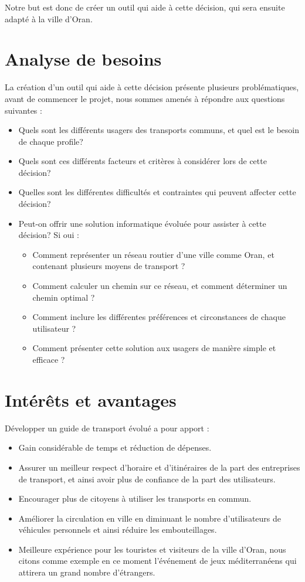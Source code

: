 Notre but est donc de créer un outil qui aide à cette décision, qui sera ensuite adapté à la ville d'Oran.

\section{Analyse de besoins}
La création d'un outil qui aide à cette décision présente plusieurs problématiques, avant de commencer le projet, nous sommes amenés à répondre aux questions suivantes :
\begin{itemize}
	\item Quels sont les différents usagers des transports communs, et quel est le besoin de chaque profile?
	\item Quels sont ces différents facteurs et critères à considérer lors de cette décision?
	\item Quelles sont les différentes difficultés et contraintes qui peuvent affecter cette décision?
	\item Peut-on offrir une solution informatique évoluée pour assister à cette décision? Si oui : 
	      \begin{itemize}
	      	\item Comment représenter un réseau routier d'une ville comme Oran, et contenant plusieurs moyens de transport ?
	      	\item Comment calculer un chemin sur ce réseau, et comment déterminer un chemin optimal ?
	      	\item Comment inclure les différentes préférences et circonstances de chaque utilisateur ?
	      	\item Comment présenter cette solution aux usagers de manière simple et efficace ?
	      \end{itemize}
\end{itemize}

\section{Intérêts et avantages}
Développer un guide de transport évolué a pour apport :
\begin{itemize}
	\item Gain considérable de temps et réduction de dépenses.
	\item Assurer un meilleur respect d'horaire et d'itinéraires de la part des entreprises de transport, et ainsi avoir plus de confiance de la part des utilisateurs.
	\item Encourager plus de citoyens à utiliser les transports en commun.
	\item Améliorer la circulation en ville en diminuant le nombre d'utilisateurs de véhicules personnels et ainsi réduire les embouteillages.
	\item Meilleure expérience pour les touristes et visiteurs de la ville d'Oran, nous citons comme exemple en ce moment l'événement de jeux méditerranéens qui attirera un grand nombre d'étrangers.
\end{itemize}

